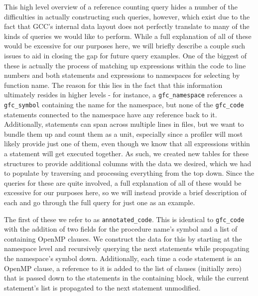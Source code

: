 This high level overview of a reference counting query hides a number of the difficulties in actually constructing such queries, however, which exist due to the fact that \acs{GCC}'s internal data layout does not perfectly translate to many of the kinds of queries we would like to perform.
While a full explanation of all of these would be excessive for our purposes here, we will briefly describe a couple such issues to aid in closing the gap for future query examples.
One of the biggest of these is actually the process of matching up expressions within the code to line numbers and both statements and expressions to namespaces for selecting by function name.
The reason for this lies in the fact that this information ultimately resides in higher levels - for instance, a \texttt{gfc\_namespace} references a \texttt{gfc\_symbol} containing the name for the namespace, but none of the \texttt{gfc\_code} statements connected to the namespace have any reference back to it.
Additionally, statements can span across multiple lines in files, but we want to bundle them up and count them as a unit, especially since a profiler will most likely provide just one of them, even though we know that all expressions within a statement will get executed together.
As such, we created new tables for these structures to provide additional columns with the data we desired, which we had to populate by traversing and processing everything from the top down.
Since the queries for these are quite involved, a full explanation of all of these would be excessive for our purposes here, so we will instead provide a brief description of each and go through the full query for just one as an example.

The first of these we refer to as \texttt{annotated\_code}.
This is identical to \texttt{gfc\_code} with the addition of two fields for the procedure name's symbol and a list of containing OpenMP clauses.
We construct the data for this by starting at the namespace level and recursively querying the next statements while propagating the namespace's symbol down.
Additionally, each time a code statement is an OpenMP clause, a reference to it is added to the list of clauses (initially zero) that is passed down to the statements in the containing block, while the current statement's list is propagated to the next statement unmodified.

